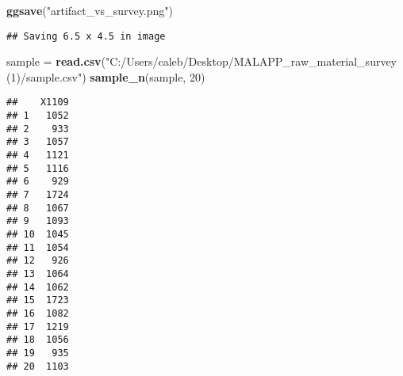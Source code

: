 \documentclass[
]{article}
\newenvironment{Shaded}{\begin{snugshade}}{\end{snugshade}}
\newcommand{\DecValTok}[1]{\textcolor[rgb]{0.00,0.00,0.81}{#1}}
\newcommand{\FunctionTok}[1]{\textcolor[rgb]{0.13,0.29,0.53}{\textbf{#1}}}
\newcommand{\NormalTok}[1]{#1}
\newcommand{\OtherTok}[1]{\textcolor[rgb]{0.56,0.35,0.01}{#1}}
\newcommand{\StringTok}[1]{\textcolor[rgb]{0.31,0.60,0.02}{#1}}
\begin{document}
\begin{Shaded}
\begin{Highlighting}[]
\FunctionTok{ggsave}\NormalTok{(}\StringTok{"artifact\_vs\_survey.png"}\NormalTok{)}
\end{Highlighting}
\end{Shaded}

\begin{verbatim}
## Saving 6.5 x 4.5 in image
\end{verbatim}

\begin{Shaded}
\begin{Highlighting}[]
\NormalTok{sample }\OtherTok{=} \FunctionTok{read.csv}\NormalTok{(}\StringTok{"C:/Users/caleb/Desktop/MALAPP\_raw\_material\_survey (1)/sample.csv"}\NormalTok{)}
\FunctionTok{sample\_n}\NormalTok{(sample, }\DecValTok{20}\NormalTok{)}
\end{Highlighting}
\end{Shaded}

\begin{verbatim}
##    X1109
## 1   1052
## 2    933
## 3   1057
## 4   1121
## 5   1116
## 6    929
## 7   1724
## 8   1067
## 9   1093
## 10  1045
## 11  1054
## 12   926
## 13  1064
## 14  1062
## 15  1723
## 16  1082
## 17  1219
## 18  1056
## 19   935
## 20  1103
\end{verbatim}
\end{document}
